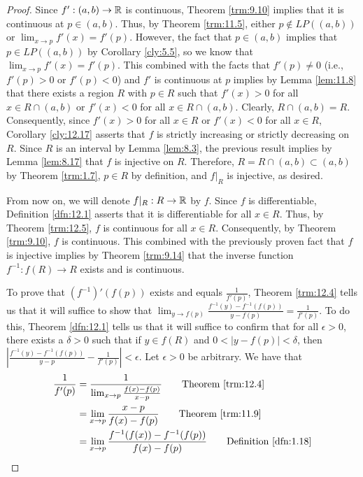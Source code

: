 \documentclass[../main.tex]{subfiles}
\begin{document}
\begin{theorem}
\begin{proof}
        Since $f':(a,b)\to\mathbb{R}$ is continuous, Theorem \ref{trm:9.10} implies that it is continuous at $p\in(a,b)$. Thus, by Theorem \ref{trm:11.5}, either $p\notin LP((a,b))$ or $\lim_{x\to p}f'(x)=f'(p)$. However, the fact that $p\in(a,b)$ implies that $p\in LP((a,b))$ by Corollary \ref{cly:5.5}, so we know that $\lim_{x\to p}f'(x)=f'(p)$. This combined with the facts that $f'(p)\neq 0$ (i.e., $f'(p)>0$ or $f'(p)<0$) and $f'$ is continuous at $p$ implies by Lemma \ref{lem:11.8} that there exists a region $R$ with $p\in R$ such that $f'(x)>0$ for all $x\in R\cap(a,b)$ or $f'(x)<0$ for all $x\in R\cap(a,b)$. Clearly, $R\cap(a,b)=R$. Consequently, since $f'(x)>0$ for all $x\in R$ or $f'(x)<0$ for all $x\in R$, Corollary \ref{cly:12.17} asserts that $f$ is strictly increasing or strictly decreasing on $R$. Since $R$ is an interval by Lemma \ref{lem:8.3}, the previous result implies by Lemma \ref{lem:8.17} that $f$ is injective on $R$. Therefore, $R=R\cap(a,b)\subset(a,b)$ by Theorem \ref{trm:1.7}, $p\in R$ by definition, and $f|_R$ is injective, as desired.\par
        From now on, we will denote $f|_R:R\to\mathbb{R}$ by $f$. Since $f$ is differentiable, Definition \ref{dfn:12.1} asserts that it is differentiable for all $x\in R$. Thus, by Theorem \ref{trm:12.5}, $f$ is continuous for all $x\in R$. Consequently, by Theorem \ref{trm:9.10}, $f$ is continuous. This combined with the previously proven fact that $f$ is injective implies by Theorem \ref{trm:9.14} that the inverse function $f^{-1}:f(R)\to R$ exists and is continuous.\par
        To prove that $(f^{-1})'(f(p))$ exists and equals $\frac{1}{f'(p)}$, Theorem \ref{trm:12.4} tells us that it will suffice to show that $\lim_{y\to f(p)}\frac{f^{-1}(y)-f^{-1}(f(p))}{y-f(p)}=\frac{1}{f'(p)}$. To do this, Theorem \ref{dfn:12.1} tells us that it will suffice to confirm that for all $\epsilon>0$, there exists a $\delta>0$ such that if $y\in f(R)$ and $0<|y-f(p)|<\delta$, then $|\frac{f^{-1}(y)-f^{-1}(f(p))}{y-p}-\frac{1}{f'(p)}|<\epsilon$. Let $\epsilon>0$ be arbitrary. We have that
        \begin{align*}
            \frac{1}{f'(p)} &= \frac{1}{\lim_{x\to p}\frac{f(x)-f(p)}{x-p}}\tag*{Theorem \ref{trm:12.4}}\\
            &= \lim_{x\to p}\frac{x-p}{f(x)-f(p)}\tag*{Theorem \ref{trm:11.9}}\\
            &= \lim_{x\to p}\frac{f^{-1}(f(x))-f^{-1}(f(p))}{f(x)-f(p)}\tag*{Definition \ref{dfn:1.18}}
        \end{align*}

\end{proof}
\end{theorem}
\end{document}
